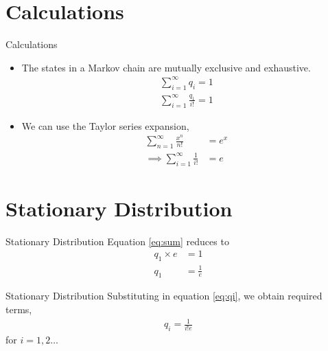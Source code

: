 \documentclass{beamer}
\begin{document}
\section{Calculations}
\begin{frame}{Calculations}
\begin{itemize}
    \item The states in a Markov chain are mutually exclusive and exhaustive.
    \begin{align}
        \sum_{i=1}^{\infty} q_i = 1 \\
        \sum_{i=1}^{\infty} \frac{q_1}{i!} = 1 
        \label{eq:sum}
    \end{align}
    \item We can use the Taylor series expansion,
    \begin{align}
        \sum_{n=1}^{\infty} \frac{x^n}{n!} &=  e^x \\
        \implies \sum_{i=1}^{\infty} \frac{1}{i!} &=  e
    \end{align}
\end{itemize}
\end{frame}
\section{Stationary Distribution}
\begin{frame}{Stationary Distribution}
    Equation \eqref{eq:sum} reduces to 
    \begin{align}
        q_1 \times e &= 1 \\
        q_1 &= \frac{1}{e}
    \end{align}
    \begin{block}{Stationary Distribution}
    Substituting in equation \eqref{eq:qi}, we obtain required terms,
    \begin{align}
        q_i = \frac{1}{i! e}
    \end{align}
    for $i = 1, 2 \dots$
    \end{block}
\end{frame}
\end{document}
